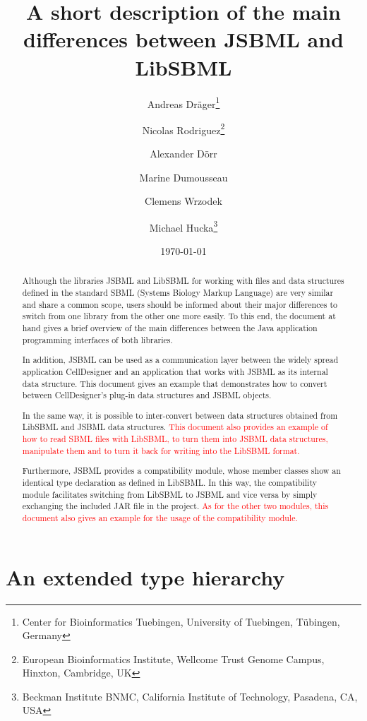 \documentclass[
  BCOR12mm,
  letterpaper,
  11pt,
  headsepline,
  pointlessnumbers,
  tablecaptionabove,
  onelinecaption,
  headinclude,
  appendixprefix,
  idxtotoc,
  bibtotoc,
  twoside,
  titlepage
]{scrartcl}
\title{A short description of the main differences between JSBML and LibSBML}
\author{Andreas Dr\"ager\thanks{Center for Bioinformatics Tuebingen, University
of Tuebingen, T\"ubingen, Germany}\and%
Nicolas Rodriguez\thanks{European Bioinformatics Institute, Wellcome Trust
Genome Campus, Hinxton, Cambridge, UK}\and%
Alexander D\"orr\footnotemark[1]\and%
Marine Dumousseau\footnotemark[2]\and%
Clemens Wrzodek\footnotemark[1]\and%
Michael Hucka\thanks{Beckman Institute BNMC, California Institute of Technology,
Pasadena, CA, USA}}
\date{\today}
\begin{document}
\maketitle
\tableofcontents

\begin{abstract}
Although the libraries JSBML and LibSBML for working with files and data
structures defined in the standard SBML (Systems Biology Markup Language) are
very similar and share a common scope, users should be informed about their
major differences to switch from one library from the other one more easily. To
this end, the document at hand gives a brief overview of the main differences
between the Java\texttrademark{} application programming interfaces of both
libraries.

In addition, JSBML can be used as a communication layer between the widely
spread application CellDesigner and an application that works with JSBML as its
internal data structure. This document gives an example that demonstrates how to
convert between CellDesigner's plug-in data structures and JSBML objects.

In the same way, it is possible to inter-convert between data structures obtained
from LibSBML and JSBML data structures. \textcolor{red}{This document also
provides an example of how to read SBML files with LibSBML, to turn them into
JSBML data structures, manipulate them and to turn it back for writing into the
LibSBML format.}

Furthermore, JSBML provides a compatibility module, whose member classes show
an identical type declaration as defined in LibSBML. In this way, the
compatibility module facilitates switching from LibSBML to JSBML and vice versa
by simply exchanging the included JAR file in the project. \textcolor{red}{As for
the other two modules, this document also gives an example for the usage of the
compatibility module.}
\end{abstract}

\section{An extended type hierarchy}
\end{document}
